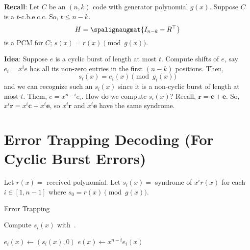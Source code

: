 \textbf{Recall}: Let $ C $ be an $ (n,k) $ code with generator polynomial
$ g(x) $. Suppose $ C $ is a $ t $-c.b.e.c.c. So, $ t\leqslant n-k $.
\[ H=\spalignaugmat{I_{n-k} -R^\top} \]
is a PCM for $ C $; $ s(x)=r(x)\pmod{g(x)} $.

\textbf{Idea}: Suppose $ e $ is a cyclic burst of length at most $ t $.
Compute shifts of $ e $, say $ e_i=x^i e $ has all its non-zero entries in the first
$ (n-k) $ positions. Then,
\[ s_i(x)=e_i(x)\pmod{g_i(x)} \]
and we can recognize such an $ s_i(x) $ since it is a non-cyclic burst of length
at most $ t $. Them, $ e=x^{n-i}e_i $. How do we compute $ s_i(x) $? Recall,
$ \symbf{r}=\symbf{c}+\symbf{e} $. So, $ x^i \symbf{r}=x^i\symbf{c}+x^i\symbf{e} $, so
$ x^i \symbf{r} $ and $ x^i\symbf{e} $ have the same syndrome.

\section{Error Trapping Decoding (For Cyclic Burst Errors)}
Let $ r(x)= $ received polynomial. Let $ s_i(x)= $ syndrome of $ x^i r(x) $ for
each $ i\in[1,n-1] $ where $ s_0=r(x)\pmod{g(x)} $.

\begin{algorithm}
    \DontPrintSemicolon{}
    \caption{Error Trapping}

     {
        Compute $ s_i(x) $ with~.

         {
            $ e_i(x)\gets(s_i(x),0) $\;
            $ e(x)\gets x^{n-i}e_i(x) $\;
        }
    }
    \Return{}
\end{algorithm}

